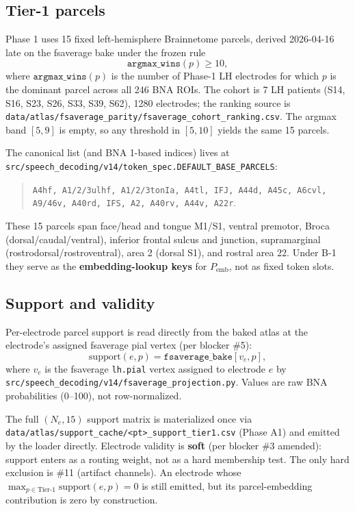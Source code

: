 \documentclass[11pt,letterpaper]{article}
\begin{document}
\subsection{Tier-1 parcels}
\label{sec:tier1}

Phase 1 uses 15 fixed left-hemisphere Brainnetome parcels, derived 2026-04-16 late on the fsaverage bake under the frozen rule
\begin{equation}
\texttt{argmax\_wins}(p) \ge 10,
\end{equation}
where $\texttt{argmax\_wins}(p)$ is the number of Phase-1 LH electrodes for which $p$ is the dominant parcel across all 246 BNA ROIs. The cohort is 7 LH patients (S14, S16, S23, S26, S33, S39, S62), 1280 electrodes; the ranking source is \texttt{data/atlas/fsaverage\_parity/fsaverage\_cohort\_ranking.csv}. The argmax band $[5, 9]$ is empty, so any threshold in $[5, 10]$ yields the same 15 parcels.

The canonical list (and BNA 1-based indices) lives at \texttt{src/speech\_decoding/v14/token\_spec.DEFAULT\_BASE\_PARCELS}:
\begin{quote}
\texttt{A4hf, A1/2/3ulhf, A1/2/3tonIa, A4tl, IFJ, A44d, A45c, A6cvl, A9/46v, A40rd, IFS, A2, A40rv, A44v, A22r}.
\end{quote}

These 15 parcels span face/head and tongue M1/S1, ventral premotor, Broca (dorsal/caudal/ventral), inferior frontal sulcus and junction, supramarginal (rostrodorsal/rostroventral), area 2 (dorsal S1), and rostral area 22. Under B-1 they serve as the \textbf{embedding-lookup keys} for $P_{\text{emb}}$, not as fixed token slots.

\subsection{Support and validity}

Per-electrode parcel support is read directly from the baked atlas at the electrode's assigned fsaverage pial vertex (per blocker \#5):
\begin{equation}
\text{support}(e,p) = \texttt{fsaverage\_bake}[v_e, p],
\end{equation}
where $v_e$ is the fsaverage \texttt{lh.pial} vertex assigned to electrode $e$ by \texttt{src/speech\_decoding/v14/fsaverage\_projection.py}. Values are raw BNA probabilities (0--100), not row-normalized.

The full $(N_e, 15)$ support matrix is materialized once via \texttt{data/atlas/support\_cache/<pt>\_support\_tier1.csv} (Phase A1) and emitted by the loader directly. Electrode validity is \textbf{soft} (per blocker \#3 amended): support enters as a routing weight, not as a hard membership test. The only hard exclusion is \#11 (artifact channels). An electrode whose $\max_{p \in \text{Tier-1}} \text{support}(e,p) = 0$ is still emitted, but its parcel-embedding contribution is zero by construction.
\end{document}
